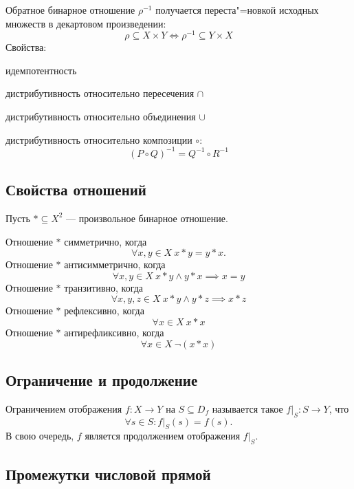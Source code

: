 \begin{theorem}
{\bold Обратное} бинарное отношение $\rho^{-1}$ получается переста"=новкой исходных множеств в декартовом произведении:
$$\rho\subseteq X\times Y\iff\rho^{-1}\subseteq Y\times X$$
Свойства:
\begin{list*}
\item идемпотентность
\item дистрибутивность относительно {\ital пересечения} $\cap$
\item дистрибутивность относительно {\ital объединения} $\cup$
\item дистрибутивность относительно {\ital композиции} $\circ$:
$$(P\circ Q)^{-1}=Q^{-1}\circ R^{-1}$$
\end{list*}
\end{theorem}

\subsection{Свойства отношений}

Пусть $\ast\subseteq X^2$ --- произвольное бинарное отношение.

Отношение $\ast$ {\ital симметрично}, когда
$$\forall x,y\in X\ x\ast y=y\ast x.$$
Отношение $\ast$ {\ital антисимметрично}, когда
$$\forall x,y\in X\ x\ast y\land y\ast x\implies x=y$$
Отношение $\ast$ {\ital транзитивно}, когда
$$\forall x,y,z\in X\ x\ast y\land y\ast z\implies x\ast z$$
Отношение $\ast$ {\ital рефлексивно}, когда
$$\forall x\in X\ x\ast x$$
Отношение $\ast$ {\ital антирефликсивно}, когда
$$\forall x\in X\ \lnot (x\ast x)$$

\subsection{Ограничение и продолжение}

{\ital Ограничением} отображения $f\colon X\to Y$ на $S\subseteq D_f$ называется
такое $f\vert_S\colon S\to Y$, что
$$\forall s\in S\colon f\vert_S(s)=f(s).$$
В свою очередь, $f$ является {\ital продолжением} отображения $f\vert_S$.

\subsection{Промежутки числовой прямой}

